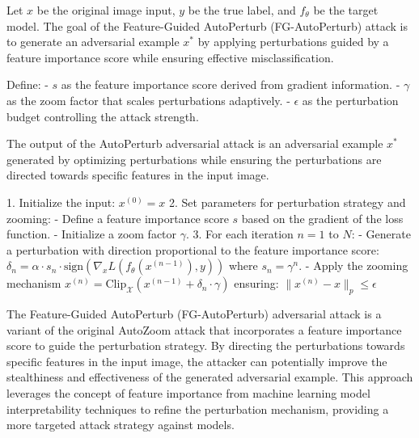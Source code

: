 Let \( x \) be the original image input, \( y \) be the true label, and \( f_{\theta} \) be the target model. The goal of the Feature-Guided AutoPerturb (FG-AutoPerturb) attack is to generate an adversarial example \( x^* \) by applying perturbations guided by a feature importance score while ensuring effective misclassification.

Define:
- \( s \) as the feature importance score derived from gradient information.
- \( \gamma \) as the zoom factor that scales perturbations adaptively.
- \( \epsilon \) as the perturbation budget controlling the attack strength.


The output of the AutoPerturb adversarial attack is an adversarial example $x^*$ generated by optimizing perturbations while ensuring the perturbations are directed towards specific features in the input image.

1. Initialize the input:
   $x^{(0)} = x$
2. Set parameters for perturbation strategy and zooming:
   - Define a feature importance score $s$ based on the gradient of the loss function.
   - Initialize a zoom factor $\gamma$.
3. For each iteration $n = 1$ to $N$:
   - Generate a perturbation with direction proportional to the feature importance score:
   $\delta_n = \alpha \cdot s_n \cdot \text{sign}(\nabla_x L(f_{\theta}(x^{(n-1)}), y))$
   where $s_n = \gamma^n$.
   - Apply the zooming mechanism
   $x^{(n)} = \text{Clip}_{\mathcal{X}}(x^{(n-1)} + \delta_n \cdot \gamma)$
   ensuring:
   $\|x^{(n)} - x\|_p \leq \epsilon$

The Feature-Guided AutoPerturb (FG-AutoPerturb) adversarial attack is a variant of the original AutoZoom attack that incorporates a feature importance score to guide the perturbation strategy. By directing the perturbations towards specific features in the input image, the attacker can potentially improve the stealthiness and effectiveness of the generated adversarial example. This approach leverages the concept of feature importance from machine learning model interpretability techniques to refine the perturbation mechanism, providing a more targeted attack strategy against models.